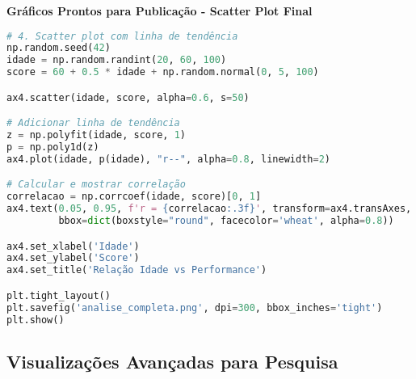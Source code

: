 \begin{examplebox}
\textbf{Gráficos Prontos para Publicação - Scatter Plot Final}

\begin{lstlisting}[language=Python]
# 4. Scatter plot com linha de tendência
np.random.seed(42)
idade = np.random.randint(20, 60, 100)
score = 60 + 0.5 * idade + np.random.normal(0, 5, 100)

ax4.scatter(idade, score, alpha=0.6, s=50)

# Adicionar linha de tendência
z = np.polyfit(idade, score, 1)
p = np.poly1d(z)
ax4.plot(idade, p(idade), "r--", alpha=0.8, linewidth=2)

# Calcular e mostrar correlação
correlacao = np.corrcoef(idade, score)[0, 1]
ax4.text(0.05, 0.95, f'r = {correlacao:.3f}', transform=ax4.transAxes,
         bbox=dict(boxstyle="round", facecolor='wheat', alpha=0.8))

ax4.set_xlabel('Idade')
ax4.set_ylabel('Score')
ax4.set_title('Relação Idade vs Performance')

plt.tight_layout()
plt.savefig('analise_completa.png', dpi=300, bbox_inches='tight')
plt.show()
\end{lstlisting}
\end{examplebox}

\subsection{Visualizações Avançadas para Pesquisa}

